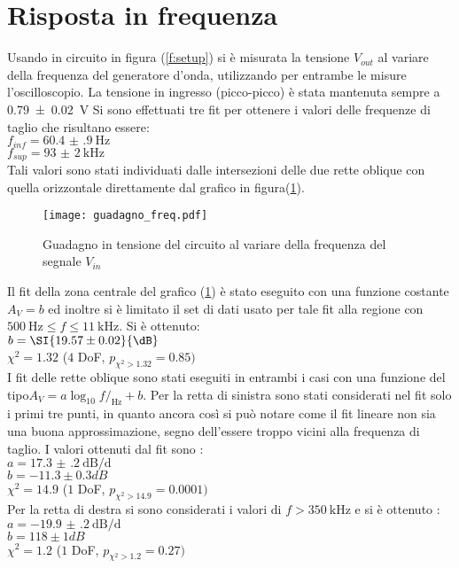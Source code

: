 \section{Risposta in frequenza}
Usando in circuito in figura (\ref{f:setup}) si è misurata la tensione $V_{out}$ al variare della frequenza del generatore d'onda, utilizzando per entrambe le misure l'oscilloscopio. La tensione in ingresso (picco-picco) è stata mantenuta sempre a \SI{0.79(2)}{\V}
Si sono effettuati tre fit per ottenere i valori delle frequenze di taglio che risultano essere:\\
$f_{inf}= \SI{60.4(9) }{\Hz} $\\
$f_{sup}= \SI{93(2) }{\kHz} $\\
Tali valori sono stati individuati dalle intersezioni delle due rette oblique con quella orizzontale direttamente dal grafico in figura(\ref{f:guadagno_freq}).

\begin{figure}[h]
	\centering
	\texttt{[image: guadagno\_freq.pdf]}
	\caption{Guadagno in tensione del circuito al variare della frequenza del segnale $V_{in}$}
	\label{f:guadagno_freq}
\end{figure}

Il fit della zona centrale del grafico (\ref{f:guadagno_freq}) è stato eseguito con una funzione costante $A_V =b$ ed inoltre si è limitato il set di dati usato per tale fit alla regione con $ \SI{500}{\Hz} \leq f \leq \SI{11}{\kHz}$. Si è ottenuto:\\
$b= \SI{19.57 \pm 0.02}{\dB}$ \\
$\chi^2= 1.32$ ($4$ DoF, $p_{\chi^2>1.32} = 0.85)$\\
I fit delle rette oblique sono stati eseguiti in entrambi i casi con una funzione del tipo$A_V = a\log_{10} f/_{\si{\Hz}} +b$. Per la retta di sinistra sono stati considerati nel fit solo i primi tre punti, in quanto ancora così si può notare come il fit lineare non sia una buona approssimazione, segno dell'essere troppo vicini alla frequenza di taglio. I valori ottenuti dal fit sono :\\
$a= \SI{17.3(2)}{\dB\per\deca} $ \\
$b=-11.3 \pm 0.3 dB $ \\
$\chi^2= 14.9$ ($1$ DoF, $p_{\chi^2>14.9} = 0.0001)$\\
Per la retta di destra si sono considerati i valori di $f> \SI{350}{\kHz}$ e si è ottenuto :\\
$a= \SI{-19.9(2)}{\dB\per\deca} $ \\
$b= 118 \pm 1 dB $ \\
$\chi^2= 1.2$ ($1$ DoF, $p_{\chi^2>1.2} = 0.27)$\\

